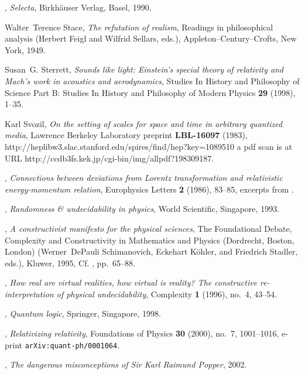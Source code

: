 \documentclass{article}
\begin{document}
\begin{thebibliography}{10}
\bysame, \emph{Selecta}, Birkh{\"{a}}user Verlag, Basel, 1990.

Walter~Terence Stace, \emph{The refutation of realism}, Readings in
  philosophical analysis (Herbert Feigl and Wilfrid Sellars, eds.),
  Appleton--Century--Crofts, New York, 1949.

Susan~G. Sterrett, \emph{Sounds like light: {E}instein's special theory of
  relativity and {M}ach's work in acoustics and aerodynamics}, Studies In
  History and Philosophy of Science Part B: Studies In History and Philosophy
  of Modern Physics \textbf{29} (1998), 1--35.

Karl Svozil, \emph{On the setting of scales for space and time in arbitrary
  quantized media}, Lawrence Berkeley Laboratory preprint \textbf{LBL-16097}
  (1983), http://heplibw3.slac.stanford.edu/spires/find/hep?key=1089510 a pdf
  scan is at URL http://ccdb3fs.kek.jp/cgi-bin/img/allpdf?198309187.

\bysame, \emph{Connections between deviations from {L}orentz transformation and
  relativistic energy-momentum relation}, Europhysics Letters \textbf{2}
  (1986), 83--85, excerpts from \cite{svo-83}.

\bysame, \emph{Randomness \& undecidability in physics}, World Scientific,
  Singapore, 1993.

\bysame, \emph{A constructivist manifesto for the physical sciences}, The
  Foundational Debate, Complexity and Constructivity in Mathematics and Physics
  (Dordrecht, Boston, London) (Werner~DePauli Schimanovich, Eckehart
  K{\"{o}}hler, and Friedrich Stadler, eds.), Kluwer, 1995, Cf.
  \cite{svozil-complexity:95}, pp.~65--88.

\bysame, \emph{How real are virtual realities, how virtual is reality? {T}he
  constructive re-interpretation of physical undecidability}, Complexity
  \textbf{1} (1996), no.~4, 43--54.

\bysame, \emph{Quantum logic}, Springer, Singapore, 1998.

\bysame, \emph{Relativizing relativity}, Foundations of Physics \textbf{30}
  (2000), no.~7, 1001--1016, e-print {\tt arXiv:quant-ph/0001064}.

\bysame, \emph{The dangerous misconceptions of {S}ir {K}arl {R}aimund
  {P}opper}, 2002.


\end{thebibliography}
\end{document}

